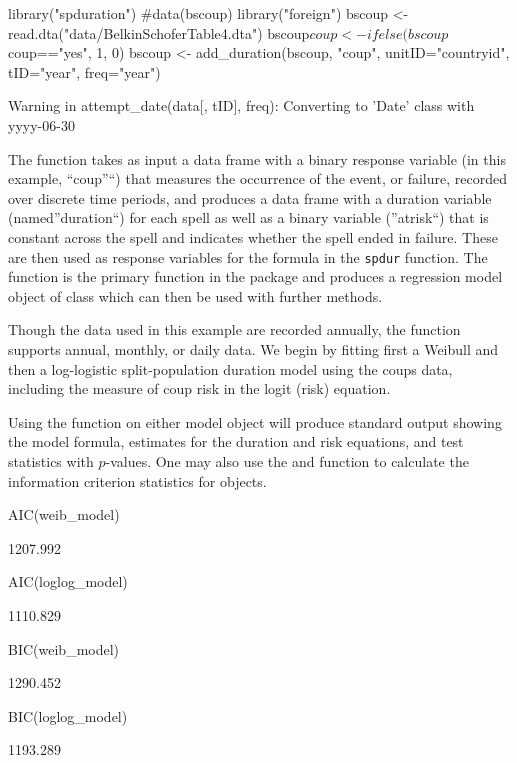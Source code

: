 \documentclass[article]{jss}
\begin{document}
\begin{CodeChunk}
\begin{CodeInput}
library("spduration")
#data(bscoup)
library("foreign")
bscoup <- read.dta("data/BelkinSchoferTable4.dta")
bscoup$coup <- ifelse(bscoup$coup=="yes", 1, 0)
bscoup      <- add_duration(bscoup, "coup", unitID="countryid", tID="year",
                            freq="year")
\end{CodeInput}
\begin{CodeOutput}
Warning in attempt_date(data[, tID], freq): Converting to 'Date' class with
yyyy-06-30
\end{CodeOutput}
\end{CodeChunk}

\normalsize
The  function takes as input a data frame with a
binary response variable (in this example, ``coup''``) that measures the
occurrence of the event, or failure, recorded over discrete time
periods, and produces a data frame with a duration variable
(named''duration``) for each spell as well as a binary variable
(''atrisk``) that is constant across the spell and indicates whether the
spell ended in failure. These are then used as response variables for
the formula in the \texttt{spdur} function. The  function is
the primary function in the package and produces a regression model
object of class  which can then be used with further
methods.

Though the data used in this example are recorded annually, the function
supports annual, monthly, or daily data. We begin by fitting first a
Weibull and then a log-logistic split-population duration model using
the coups data, including the measure of coup risk in the logit (risk)
equation.

Using the  function on either model object will produce
standard output showing the model formula, estimates for the duration
and risk equations, and test statistics with \(p\)-values. One may also
use the  and  function to calculate the information
criterion statistics for  objects.

\begin{CodeChunk}
\begin{CodeInput}
AIC(weib_model)
\end{CodeInput}
\begin{CodeOutput}
[1] 1207.992
\end{CodeOutput}
\begin{CodeInput}
AIC(loglog_model)
\end{CodeInput}
\begin{CodeOutput}
[1] 1110.829
\end{CodeOutput}
\begin{CodeInput}
BIC(weib_model)
\end{CodeInput}
\begin{CodeOutput}
[1] 1290.452
\end{CodeOutput}
\begin{CodeInput}
BIC(loglog_model)
\end{CodeInput}
\begin{CodeOutput}
[1] 1193.289
\end{CodeOutput}
\end{CodeChunk}
\end{document}
